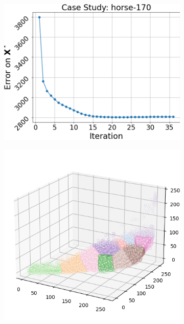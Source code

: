 \begin{figure}[htbp]
    \begin{subfigure}[t]{0.32\textwidth}
        \includegraphics[width=\linewidth]{../../python_code/plots/kmeans/horse-170/elbow_curve.png}
    \end{subfigure}
    \begin{subfigure}[t]{0.32\textwidth}
        \includegraphics[width=\linewidth]{../../python_code/plots/kmeans/horse-170/clusters_elev20_azim-60.png}
    \end{subfigure}

\end{figure}
